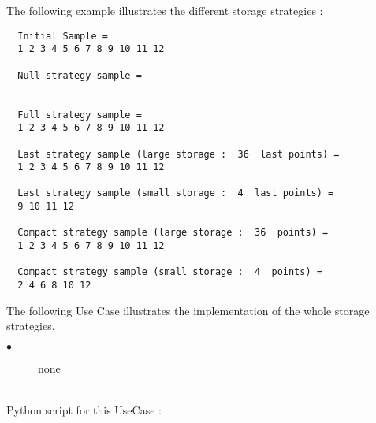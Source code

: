 The following example illustrates the different storage strategies :

\begin{verbatim}
  Initial Sample =
  1 2 3 4 5 6 7 8 9 10 11 12

  Null strategy sample =


  Full strategy sample =
  1 2 3 4 5 6 7 8 9 10 11 12

  Last strategy sample (large storage :  36  last points) =
  1 2 3 4 5 6 7 8 9 10 11 12

  Last strategy sample (small storage :  4  last points) =
  9 10 11 12

  Compact strategy sample (large storage :  36  points) =
  1 2 3 4 5 6 7 8 9 10 11 12

  Compact strategy sample (small storage :  4  points) =
  2 4 6 8 10 12
\end{verbatim}

The following Use Case illustrates the implementation of the whole storage strategies.\\

             {
               \begin{description}
               \item[$\bullet$]  none
               \end{description}
             }

             \textspace\\
             Python  script for this UseCase :


